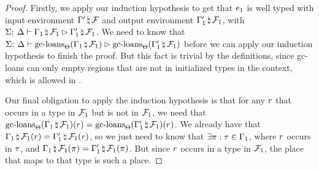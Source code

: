 \begin{proof}
  \vspace{1em}
  \noindent {} \vspace{1em}

  Firstly, we apply our induction hypothesis to get that $e_1$ is well
  typed with input environment $\Gamma^\prime \, \natural \, \mathcal{F}$ and
  output environment $\Gamma_1^\prime \, \natural \, \mathcal{F}_1$, with
  $\Sigma; \: \Delta \vdash \Gamma_1 \, \natural \, \mathcal{F}_1 \rhd \Gamma_1^\prime \, \natural \, \mathcal{F}_1$.
  We need to know that
  $\Sigma; \: \Delta \vdash \textrm{gc-loans}_{\Theta}(\Gamma_1 \, \natural \, \mathcal{F}_1) \rhd \textrm{gc-loans}_{\Theta}(\Gamma_1^\prime \, \natural \, \mathcal{F}_1)$
  before we can apply our induction hypothesis to finish the proof. But this
  fact is trivial by the definitions, since \textrm{gc-loans} can only empty
  regions that are not in initialized types in the context, which is allowed in
  .

  Our final obligation to apply the induction hypothesis is that for any
  $r$ that occurs in a type in $\mathcal{F}_{1}$ but is not in
  $\mathcal{F}_{1}$, we need that
  $\textrm{gc-loans}_{\Theta}(\Gamma_{1} \, \natural \, \mathcal{F}_{1})(r) =
  \textrm{gc-loans}_{\Theta}(\Gamma_{1}^\prime \, \natural \, \mathcal{F}_{1})(r)$.
  We already have that $\Gamma_{1} \, \natural \, \mathcal{F}_{1}(r) =
  \Gamma_{1}^\prime \, \natural \, \mathcal{F}_{1}(r)$, so we just need to
  know that $\exists \pi : \tau \in \Gamma_{1}$, where $r$
  occurs in $\tau$, and $\Gamma_{1} \, \natural \, \mathcal{F}_1(\pi) =
  \Gamma_{1}^\prime \, \natural \, \mathcal{F}_1(\pi)$. But since $r$
  occurs in a type in $\mathcal{F}_1$, the place that maps to that type is such a
  place.
  

\end{proof}
